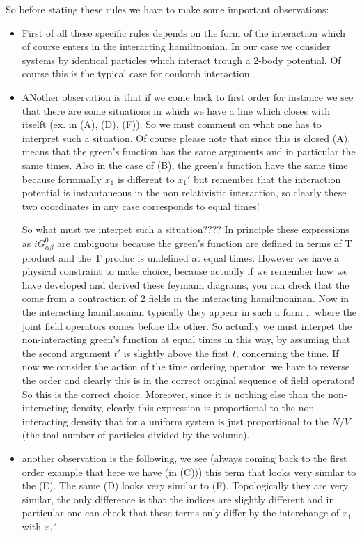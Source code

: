 \documentclass[../main/main.tex]{subfiles}
\begin{document}
So before stating these rules we have to make some important observations:
\begin{itemize}
\item First of all these specific rules depends on the form of the interaction which of course enters in the interacting hamiltnonian. In our case we consider systems by identical particles which interact trough a 2-body potential. Of course this is the typical case for coulomb interaction.

\item ANother observation is that if we come back to first order for instance we see that there are some situations in which we have a line which closes with itselft (ex. in (A), (D), (F)).
So we must comment on what one has to interpret such a situation. Of course please note that since this is closed (A), means that the green's function has the same arguments and in particular the same times. Also in the case of (B), the green's function have the same time because formmally \( x_1 \) is different to \( x_1' \) but remember that the interaction potential is instantaneous in the non relativistic interaction, so clearly these two coordinates in any case corresponds to equal times!

So what must we interpet such a situation????
In principle these expressions as \( i G^0 _{\alpha \beta } \) are ambiguous because the green's function are defined in terms of T product and the T produc is undefined at equal times. However we have a physical constraint to make choice, because actually if we remember how we have developed and derived these feymann diagrams, you can check that the come from a contraction of 2 fields in the interacting hamiltnoninan. Now in the interacting hamiltnonian typically they appear in such a form .. where the joint field operators comes before the other.
So actually we must interpet the non-interacting green's function at equal times in this way, by assuming that the second argument \( t' \) is slightly above the first \( t \), concerning the time. If now we consider the action of the time ordering operator, we have to reverse the order and clearly this is in the correct original sequence of field operators! So this is the correct choice.
Moreover, since  it is nothing else than the non-interacting density, clearly this expression is proportional to the non-interacting density that for a uniform system is just proportional to the \( N/V \) (the toal number of particles divided by the volume).

\item another observation is the following, we see (always coming back to the first order example that here we have (in (C))) this term that looks very similar to the (E). The same (D) looks very similar to (F).
Topologically they are very similar, the only difference is that the indices are slightly different and in particular one can check that these terms only differ by the interchange of \( x_1 \) with \( x_1' \).


\end{itemize}
\end{document}

